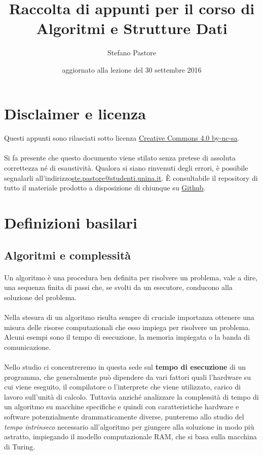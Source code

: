\documentclass[11pt,a4paper,oneside]{article}
\title{Raccolta di appunti per il corso di\\\Huge{Algoritmi e Strutture Dati}}
\author{Stefano Pastore}
\date{\tiny{aggiornato alla lezione del 30 settembre 2016}}
\begin{document}
\maketitle
\pagebreak
\tableofcontents
\pagebreak

\section*{Disclaimer e licenza}
\paragraph*{} Questi appunti sono rilasciati sotto licenza \href{https://creativecommons.org/licenses/by-nc-sa/4.0/}{Creative Commons 4.0 by-nc-sa}.
\paragraph*{} Si fa presente che questo documento viene stilato senza pretese di assoluta correttezza né di esaustività. Qualora si siano rinvenuti degli errori, è possibile segnalarli all'indirizzo\linebreak \href{mailto:ste.pastore@studenti.unina.it}{ste.pastore@studenti.unina.it}. È consultabile il repository di tutto il materiale prodotto a disposizione di chiunque su \href{https://github.com/stefano-pastore/asd}{Github}.
\pagebreak
\section{Definizioni basilari}
\subsection{Algoritmi e complessità}
\paragraph*{} Un algoritmo è una procedura ben definita per risolvere un problema, vale a dire, una sequenza finita di passi che, se svolti da un esecutore, conducono alla soluzione del problema.
\paragraph*{} Nella stesura di un algoritmo risulta sempre di cruciale importanza ottenere una misura delle risorse computazionali che esso impiega per risolvere un problema. Alcuni esempi sono il tempo di esecuzione, la memoria impiegata o la banda di comunicazione.
\paragraph*{} Nello studio ci concentreremo in questa sede sul \textbf{tempo di esecuzione} di un programma, che generalmente può dipendere da vari fattori quali l'hardware su cui viene eseguito, il compilatore o l'interprete che viene utilizzato, carico di lavoro sull'unità di calcolo. Tuttavia anziché analizzare la complessità di tempo di un algoritmo su macchine specifiche e quindi con caratteristiche hardware e software potenzialmente drammaticamente diverse, punteremo allo studio del \textit{tempo intrinseco} necessario all'algoritmo per giungere alla soluzione in modo più astratto, impiegando il modello computazionale RAM, che si basa sulla macchina di Turing.
\end{document}
